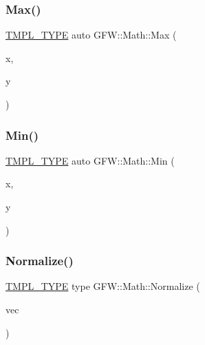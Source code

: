 \mbox{\label{namespace_g_f_w_1_1_math_ae9361358f1332656368695fd2424f9fd}} 
\subsubsection{\texorpdfstring{Max()}{Max()}}
{\footnotesize\ttfamily \hyperlink{_math_8h_a2618808fbb8e74983f8aaea56d02752b}{T\+M\+P\+L\+\_\+\+T\+Y\+PE} auto G\+F\+W\+::\+Math\+::\+Max (\begin{DoxyParamCaption}\item[{const type \&}]{x,  }\item[{const type \&}]{y }\end{DoxyParamCaption})}

\mbox{\label{namespace_g_f_w_1_1_math_ad39891804b4d4fc6da106f2cb6be74f4}} 
\subsubsection{\texorpdfstring{Min()}{Min()}}
{\footnotesize\ttfamily \hyperlink{_math_8h_a2618808fbb8e74983f8aaea56d02752b}{T\+M\+P\+L\+\_\+\+T\+Y\+PE} auto G\+F\+W\+::\+Math\+::\+Min (\begin{DoxyParamCaption}\item[{const type \&}]{x,  }\item[{const type \&}]{y }\end{DoxyParamCaption})}

\mbox{\label{namespace_g_f_w_1_1_math_a0d95c731b9233b5973fbf81eb2980c53}} 
\subsubsection{\texorpdfstring{Normalize()}{Normalize()}}
{\footnotesize\ttfamily \hyperlink{_math_8h_a2618808fbb8e74983f8aaea56d02752b}{T\+M\+P\+L\+\_\+\+T\+Y\+PE} type G\+F\+W\+::\+Math\+::\+Normalize (\begin{DoxyParamCaption}\item[{const type \&}]{vec }\end{DoxyParamCaption})}

